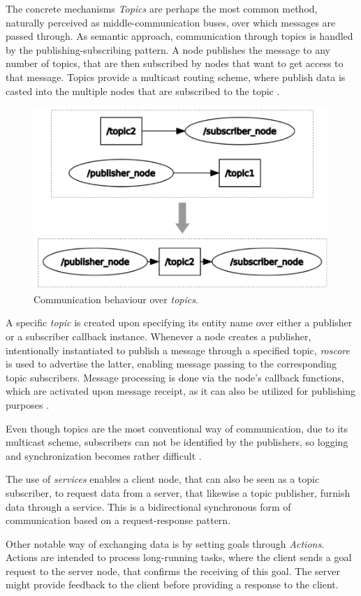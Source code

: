 The concrete mechanisms
\textit{Topics} are perhaps the most common method, naturally perceived as middle-communication buses, over which messages are passed through. As semantic approach, communication through topics is handled by the publishing-subscribing pattern. A node publishes the message to any number of topics, that are then subscribed by nodes that want to get access to that message. Topics provide a multicast routing scheme, where publish data is casted into the multiple nodes that are subscribed to the topic \cite{casini2019response}.

\begin{figure}[H]
    \centering
    \includegraphics[width=0.5\linewidth]{img/ros2-topics.png}
    \caption{Communication behaviour over \textit{topics}.}
    \label{fig:ros2-topics}
\end{figure}

A specific \textit{topic} is created upon specifying its entity name over either a publisher or a subscriber callback instance. Whenever a node creates a publisher, intentionally instantiated to publish a message through a specified topic, \textit{roscore} is used to advertise the latter, enabling message passing to the corresponding topic subscribers. Message processing is done via the node's callback functions, which are activated upon message receipt, as it can also be utilized for publishing purposes \cite{casini2019response}.

Even though topics are the most conventional way of communication, due to its multicast scheme, subscribers can not be identified by the publishers, so logging and synchronization becomes rather difficult \cite{intro-ros}.

The use of \textit{services} enables a client node, that can also be seen as a topic subscriber, to request data from a server, that likewise a topic publisher, furnish data through a service. This is a bidirectional synchronous form of communication based on a request-response pattern.

Other notable way of exchanging data is by setting goals through \textit{Actions}. Actions are intended to process long-running tasks, where the client sends a goal request to the server node, that confirms the receiving of this goal. The server might provide feedback to the client before providing a response to the client. 


